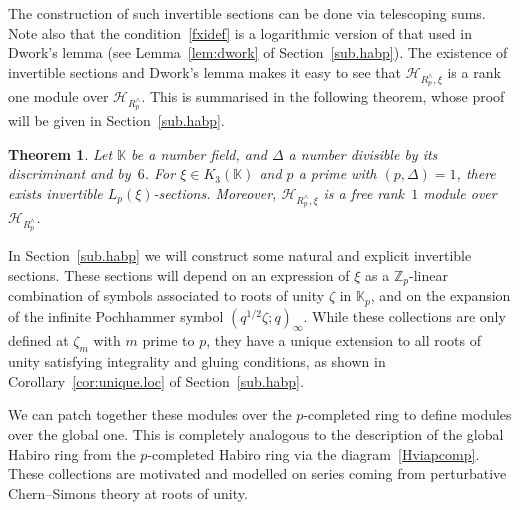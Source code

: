 \documentclass[12pt,reqno]{amsart}
\newcounter{theoremcount}
\newtheorem{theorem}[theoremcount]{Theorem}
\theoremstyle{definition}
\def\BZ{\mathbb Z}
\def\BK{\mathbb K}
\def\calH{\mathcal H}
\def\z{\zeta}
\begin{document}
The construction of such invertible sections can be done via telescoping sums.
Note also that the condition~\eqref{fxidef} is a logarithmic version of that used in
Dwork's lemma (see Lemma~\ref{lem:dwork} of Section~\ref{sub.habp}).
The existence of invertible sections and Dwork's lemma makes it easy to see that
$\calH_{R_p^\wedge,\xi}$ is a rank one module over $\calH_{R_p^\wedge}$.
This is summarised in the following theorem, whose proof will be given in
Section~\ref{sub.habp}.

\begin{theorem}
\label{thm.locals}
Let $\BK$ be a number field, and $\Delta$ a number divisible by its discriminant
and by~$6$. For $\xi \in K_3(\BK)$ and $p$ a prime with $(p,\Delta)=1$, there exists
invertible $L_p(\xi)$-sections. Moreover, $\calH_{R^\wedge_p,\xi}$ is a free rank~$1$
module over $\calH_{R^\wedge_p}$.
\end{theorem}

In Section~\ref{sub.habp} we will construct some natural and explicit
invertible sections.
These sections will depend on an expression of $\xi$ as a $\BZ_p$-linear combination of
symbols associated to roots of unity $\z$ in $\BK_p$, and on the expansion of the
infinite Pochhammer symbol $(q^{1/2}\z;q)_\infty$.
While these collections are only defined at $\z_m$ with $m$ prime to $p$,
they have a unique extension to all roots of unity satisfying integrality
and gluing conditions, as shown in Corollary~\ref{cor:unique.loc} of
Section~\ref{sub.habp}.

We can patch together these modules over the $p$-completed ring to define modules
over the global one.
This is completely analogous to the description of the global Habiro ring from
the $p$-completed Habiro ring via the diagram~\eqref{Hviapcomp}.
These collections are motivated and modelled on series coming from
perturbative Chern--Simons theory at roots of unity. 
\end{document}

